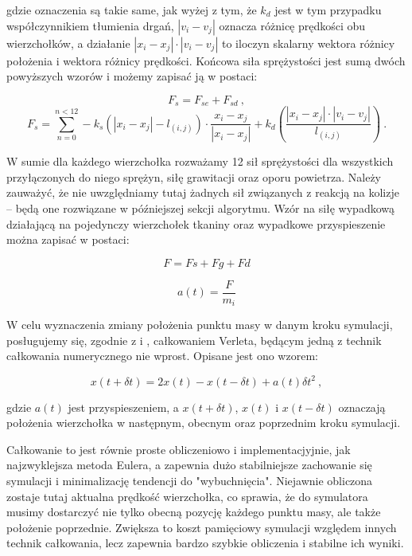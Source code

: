 			gdzie oznaczenia są takie same, jak wyżej z tym, że \(k_{d}\) jest w tym przypadku współczynnikiem tłumienia drgań, \(|v_{i} - v_{j}|\) oznacza różnicę prędkości obu wierzchołków, a działanie \(|x_{i} - x_{j}| \cdot |v_{i} - v_{j}|\) to iloczyn skalarny wektora różnicy położenia i wektora różnicy prędkości. Końcowa siła sprężystości jest sumą dwóch powyższych wzorów i możemy zapisać ją w postaci:
			
			\begin{equation}
			F_{s} = F_{se} + F_{sd} \ ,
			\end{equation}
			\begin{equation}
			F_{s} = \sum_{n = 0}^{n < 12} - k_{s} (|x_{i} - x_{j}| - l_{(i, j)}) \cdot \frac{x_{i} - x_{j}}{|x_{i} - x_{j}|} + k_{d}(\frac{|x_{i} - x_{j}| \cdot |v_{i} - v_{j}|}{l_{(i, j)}}) \ .
			\end{equation}
			
			W sumie dla każdego wierzchołka rozważamy 12 sił sprężystości dla wszystkich przyłączonych do niego sprężyn, siłę grawitacji oraz oporu powietrza. Należy zauważyć, że nie uwzględniamy tutaj żadnych sił związanych z reakcją na kolizje -- będą one rozwiązane w późniejszej sekcji algorytmu. Wzór na siłę wypadkową działającą na pojedynczy wierzchołek tkaniny oraz wypadkowe przyspieszenie można zapisać w postaci:
			
			\begin{equation}
			F = F{s} + F{g} + F{d}		
			\end{equation}
			
			\begin{equation}
			a(t) = \frac{F}{m_{i}}	
			\end{equation}
			
			W celu wyznaczenia zmiany położenia punktu masy w danym kroku symulacji, posługujemy się, zgodnie z \cite{cloth-dobre-wzory} i \cite{receptury}, całkowaniem Verleta, będącym jedną z technik całkowania numerycznego nie wprost. Opisane jest ono wzorem:
			
			\begin{equation}
			x(t + \delta t) = 2x(t) - x(t - \delta t) + a(t) \delta t^{2} \ ,		
			\end{equation}
			
			gdzie \(a(t)\) jest przyspieszeniem, a \(x(t + \delta t)\), \(x(t)\) i \(x(t - \delta t)\) oznaczają położenia wierzchołka w następnym, obecnym oraz poprzednim kroku symulacji. 
			
			Całkowanie to jest równie proste obliczeniowo i implementacjyjnie, jak najzwyklejsza metoda Eulera, a zapewnia dużo stabilniejsze zachowanie się symulacji i minimalizację tendencji do "wybuchnięcia". Niejawnie obliczona zostaje tutaj aktualna prędkość wierzchołka, co sprawia, że do symulatora musimy dostarczyć nie tylko obecną pozycję każdego punktu masy, ale także położenie poprzednie. Zwiększa to koszt pamięciowy symulacji względem innych technik całkowania, lecz zapewnia bardzo szybkie obliczenia i stabilne ich wyniki.
		
